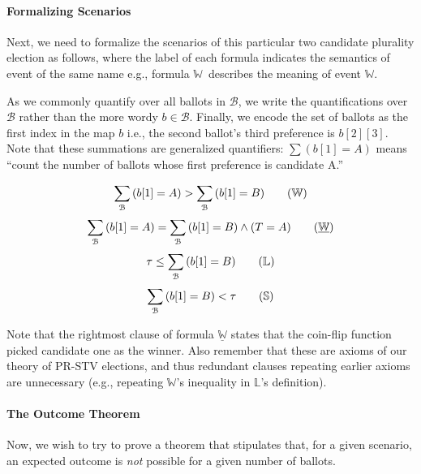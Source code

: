 \documentclass[runningheads,a4paper]{llncs}
\newcommand{\eg}{e.g.,\xspace}
\newcommand{\ie}{i.e.,\xspace}
\newcommand{\ballots}{\ensuremath{\mathcal{B}}\xspace}
\newcommand{\winner}{\ensuremath{\mathbb{W}}}
\newcommand{\loser}{\ensuremath{\mathbb{L}}}
\newcommand{\belowthreshold}{\ensuremath{\mathbb{S}}}
\newcommand{\tiebreak}[1]{\ensuremath{\underline{#1}}}
\begin{document}
\paragraph*{Formalizing Scenarios}

Next, we need to formalize the scenarios of this particular two
candidate plurality election as follows, where the label of each
formula indicates the semantics of event of the same name \eg formula
\winner\ describes the meaning of event \winner.

As we commonly quantify over all ballots in \ballots, we write the
quantifications over \ballots rather than the more wordy $b \in
\ballots$.  Finally, we encode the set of ballots as the first index
in the map $b$ \ie the second ballot's third preference is $b[2][3]$.
Note that these summations are generalized quantifiers: $\sum(b[1]=A)$
means ``count the number of ballots whose first preference is
candidate A.''
\begin{center}
  \begin{equation*}
    \sum_\ballots{(b[1] = A)} > \sum_\ballots{(b[1] = B)}
    \tag{\winner}
  \end{equation*}
  \begin{equation*}
    \sum_\ballots{(b[1] = A)} = \sum_\ballots{(b[1] = B)} \wedge (T = A)
    \tag{\tiebreak{\winner}}
  \end{equation*}
  \begin{equation*}
    \tau \le \sum_\ballots{(b[1] = B)}
    \tag{\loser}
  \end{equation*}
  \begin{equation*}
    \sum_\ballots{(b[1] = B)} < \tau
    \tag{\belowthreshold}
  \end{equation*}
\end{center}

Note that the rightmost clause of formula $\tiebreak{\winner}$\xspace
states that the coin-flip function picked candidate one as the winner.
Also remember that these are axioms of our theory of PR-STV elections,
and thus redundant clauses repeating earlier axioms are unnecessary
(\eg repeating $\winner$'s inequality in $\loser$'s definition).

\paragraph*{The Outcome Theorem}

Now, we wish to try to prove a theorem that stipulates that, for a
given scenario, an expected outcome is \emph{not} possible for a given
number of ballots.
\end{document}
